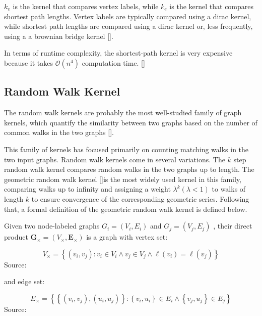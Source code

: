 $k_{v}$ is the kernel that compares vertex labels, while $k_{e}$ is the kernel that compares shortest path lengths. Vertex labels are typically compared using a dirac kernel, while shortest path lengths are compared using a dirac kernel or, less frequently, using a a brownian bridge kernel [\cite{Karsten:2005}].

In terms of runtime complexity, the shortest-path kernel is very expensive because it takes $\mathcal{O}\left(n^{4}\right)$ computation time. [\cite{Siglidis:2018}]

\subsection{Random Walk Kernel}
The random walk kernels are probably the most well-studied family of graph kernels, which quantify the similarity between two graphs based on the number of common walks in the two graphs [\cite{Kashima:2003, Gartner:2003, Mahé:2004, Karsten:2005, Vishwanathan:2010, Sugiyama:2015, Siglidis:2018}].

This family of kernels has focused primarily on counting matching walks in the two input graphs. Random walk kernels come in several variations. The $k$ step random walk kernel compares random walks in the two graphs up to length.  The geometric random walk kernel [\cite{Gartner:2003}]is the most widely used kernel in this family, comparing walks up to infinity and assigning a weight $\lambda^{k}(\lambda<1)$ to walks of length $k$ to ensure convergence of the corresponding geometric series. Following that, a formal definition of the geometric random walk kernel is defined below. 

Given two node-labeled graphs $G_{i}=\left(V_{i}, E_{i}\right)$  and $G_{j}=\left(V_{j}, E_{j}\right)$ , their direct product $\boldsymbol{G}_{\times}=\left(V_{\times}, \boldsymbol{E}_{\times}\right)$ is a graph with vertex set:

\begin{equation}
V_{\times}=\left\{\left(v_{i}, v_{j}\right): v_{i} \in V_{i} \wedge v_{j} \in V_{j} \wedge \ell\left(v_{i}\right)=\ell\left(v_{j}\right)\right\}   
\end{equation}
Source: \cite{Siglidis:2018}

and edge set:

\begin{equation}
E_{\times}=\left\{\left\{\left(v_{i}, v_{j}\right),\left(u_{i}, u_{j}\right)\right\}:\left\{v_{i}, u_{i}\right\} \in E_{i} \wedge\left\{v_{j}, u_{j}\right\} \in E_{j}\right\} 
\end{equation}
Source: \cite{Siglidis:2018}


